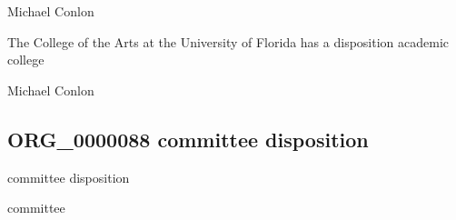\documentclass[letterpaper,10pt,english]{sphinxmanual}
\begin{document}
\begin{sphinxShadowBox}

\sphinxAtStartPar
Michael Conlon 
\end{sphinxShadowBox}

\begin{sphinxShadowBox}

\sphinxAtStartPar
The College of the Arts at the University of Florida has a disposition academic college
\end{sphinxShadowBox}

\begin{sphinxShadowBox}

\sphinxAtStartPar
{}
\end{sphinxShadowBox}

\begin{sphinxShadowBox}

\sphinxAtStartPar
Michael Conlon 
\end{sphinxShadowBox}
\begin{quote}

\ignorespaces \end{quote}


\subsection{ORG\_0000088 \sphinxhyphen{} committee disposition}
\label{\detokenize{doc-ORG_0000088:org-0000088-committee-disposition}}\label{\detokenize{doc-ORG_0000088:index-0}}\label{\detokenize{doc-ORG_0000088::doc}}
\begin{sphinxShadowBox}

\sphinxAtStartPar
committee disposition
\end{sphinxShadowBox}

\begin{sphinxShadowBox}

\sphinxAtStartPar
committee
\end{sphinxShadowBox}
\end{document}
